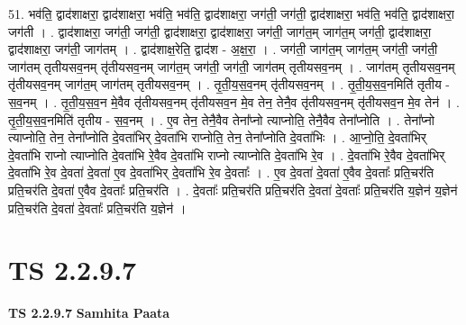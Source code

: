 \documentclass[17pt]{extarticle}
\begin{document}
51. भव॑ति॒ द्वाद॑शाक्षरा॒ द्वाद॑शाक्षरा॒ भव॑ति॒ भव॑ति॒ द्वाद॑शाक्षरा॒ जग॑ती॒ जग॑ती॒ द्वाद॑शाक्षरा॒ भव॑ति॒ भव॑ति॒ द्वाद॑शाक्षरा॒ जग॑ती । . द्वाद॑शाक्षरा॒ जग॑ती॒ जग॑ती॒ द्वाद॑शाक्षरा॒ द्वाद॑शाक्षरा॒ जग॑ती॒ जाग॑त॒म् जाग॑त॒म् जग॑ती॒ द्वाद॑शाक्षरा॒ द्वाद॑शाक्षरा॒ जग॑ती॒ जाग॑तम् । . द्वाद॑शाक्ष॒रेति॒ द्वाद॑श - अ॒क्ष॒रा॒ । . जग॑ती॒ जाग॑त॒म् जाग॑त॒म् जग॑ती॒ जग॑ती॒ जाग॑तम् तृतीयसव॒नम् तृ॑तीयसव॒नम् जाग॑त॒म् जग॑ती॒ जग॑ती॒ जाग॑तम् तृतीयसव॒नम् । . जाग॑तम् तृतीयसव॒नम् तृ॑तीयसव॒नम् जाग॑त॒म् जाग॑तम् तृतीयसव॒नम् । . तृ॒ती॒य॒स॒व॒नम् तृ॑तीयसव॒नम् । . तृ॒ती॒य॒स॒व॒नमिति॑ तृतीय - स॒व॒नम् । . तृ॒ती॒य॒स॒व॒न मे॒वैव तृ॑तीयसव॒नम् तृ॑तीयसव॒न मे॒व तेन॒ तेनै॒व तृ॑तीयसव॒नम् तृ॑तीयसव॒न मे॒व तेन॑ । . तृ॒ती॒य॒स॒व॒नमिति॑ तृतीय - स॒व॒नम् । . ए॒व तेन॒ तेनै॒वैव तेना᳚प्नो त्याप्नोति॒ तेनै॒वैव तेना᳚प्नोति । . तेना᳚प्नो त्याप्नोति॒ तेन॒ तेना᳚प्नोति दे॒वता॑भिर् दे॒वता॑भि राप्नोति॒ तेन॒ तेना᳚प्नोति दे॒वता॑भिः । . आ॒प्नो॒ति॒ दे॒वता॑भिर् दे॒वता॑भि राप्नो त्याप्नोति दे॒वता॑भि रे॒वैव दे॒वता॑भि राप्नो त्याप्नोति दे॒वता॑भि रे॒व । . दे॒वता॑भि रे॒वैव दे॒वता॑भिर् दे॒वता॑भि रे॒व दे॒वता॑ दे॒वता॑ ए॒व दे॒वता॑भिर् दे॒वता॑भि रे॒व दे॒वताः᳚ । . ए॒व दे॒वता॑ दे॒वता॑ ए॒वैव दे॒वताः᳚ प्रति॒चर॑ति प्रति॒चर॑ति दे॒वता॑ ए॒वैव दे॒वताः᳚ प्रति॒चर॑ति । . दे॒वताः᳚ प्रति॒चर॑ति प्रति॒चर॑ति दे॒वता॑ दे॒वताः᳚ प्रति॒चर॑ति य॒ज्ञेन॑ य॒ज्ञेन॑ प्रति॒चर॑ति दे॒वता॑ दे॒वताः᳚ प्रति॒चर॑ति य॒ज्ञेन॑ । \newline
\pagebreak
{}

\section{ TS 2.2.9.7 }

\textbf{TS 2.2.9.7 } \newline
\textbf{Samhita Paata} \newline
\end{document}

